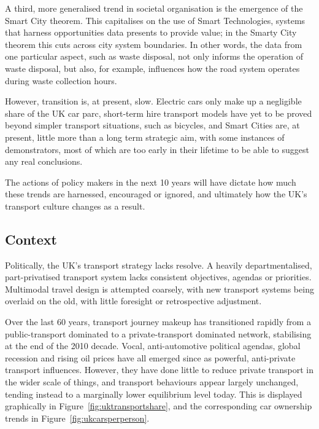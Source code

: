\documentclass[conference]{IEEEtran}
\begin{document}
A third, more generalised trend in societal organisation is the
emergence of the Smart City theorem. This capitalises on the use of
Smart Technologies, systems that harness opportunities data presents
to provide value; in the Smarty City theorem this cuts across city
system boundaries. In other words, the data from one particular
aspect, such as waste disposal, not only informs the operation of
waste disposal, but also, for example, influences how the road system
operates during waste collection hours.

However, transition is, at present, slow. Electric cars only make up a
negligible share of the UK car parc, short-term hire transport models
have yet to be proved beyond simpler transport situations, such as
bicycles, and Smart Cities are, at present, little more than a long
term strategic aim, with some instances of demonstrators, most of
which are too early in their lifetime to be able to suggest any real
conclusions. 

The actions of policy makers in the next 10 years will have dictate
how much these trends are harnessed, encouraged or ignored, and
ultimately how the UK’s transport culture changes as a result.

\subsection{Context}

Politically, the UK’s transport strategy lacks resolve. A heavily
departmentalised, part-privatised transport system lacks consistent
objectives, agendas or priorities. Multimodal travel design is
attempted coarsely, with new transport systems being overlaid on the
old, with little foresight or retrospective adjustment.

Over the last 60 years, transport journey makeup has transitioned
rapidly from a public-transport dominated to a private-transport
dominated network, stabilising at the end of the 2010 decade. Vocal,
anti-automotive political agendas, global recession and rising oil
prices have all emerged since as powerful, anti-private transport
influences. However, they have done little to reduce private transport
in the wider scale of things, and transport behaviours appear largely
unchanged, tending instead to a marginally lower equilibrium level
today. This is displayed graphically in
Figure~\ref{fig:uktransportshare}, and the corresponding car ownership
trends in Figure~\ref{fig:ukcarsperperson}.
\end{document}
